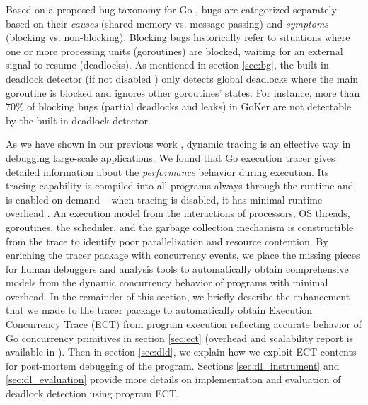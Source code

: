 Based on a proposed bug taxonomy for Go \cite{tu-concurrentBugs-asplos19}, bugs are categorized separately based on their \textit{causes} (shared-memory vs. message-passing) and \textit{symptoms} (blocking vs. non-blocking).
%
Blocking bugs historically refer to situations where one or more processing units (\eg goroutines) are blocked, waiting for an external signal to resume (\ie deadlocks).
%
As mentioned in section \ref{sec:bg}, the built-in deadlock detector (if not disabled \cite{go-netDeadlock}) only detects global deadlocks where the main goroutine is blocked and ignores other goroutines' states. For instance, more than 70\% of blocking bugs (partial deadlocks and leaks) in GoKer \cite{GoKer} are not detectable by the built-in deadlock detector.
%

As we have shown in our previous work \cite{parlot,difftrace}, dynamic tracing is an effective way in debugging large-scale applications.
%
We found that Go execution tracer \cite{go-cmd-trace} gives detailed information about the \textit{performance} behavior during execution.
%
Its tracing capability is compiled into all programs always through the runtime and is enabled on demand -- when tracing is disabled, it has minimal runtime overhead \cite{go-exec-tracer-doc}.
%
An execution model from the interactions of processors, OS threads, goroutines, the scheduler, and the garbage collection mechanism is constructible from the trace to identify poor parallelization and resource contention.
%
By enriching the tracer package with concurrency events, we place the missing pieces for human debuggers and analysis tools to automatically obtain comprehensive models from the dynamic concurrency behavior of programs with minimal overhead.
%
In the remainder of this section, we briefly describe the enhancement that we made to the tracer package to automatically obtain Execution Concurrency Trace (ECT) from program execution reflecting accurate behavior of Go concurrency primitives in section \ref{sec:ect} (overhead and scalability report is available in \cite{ect-arxiv}).
%
Then in section \ref{sec:dld}, we explain how we exploit ECT contents for post-mortem debugging of the program.
%
Sections \ref{sec:dl_instrument} and \ref{sec:dl_evaluation} provide more details on implementation and evaluation of deadlock detection using program ECT.



%


